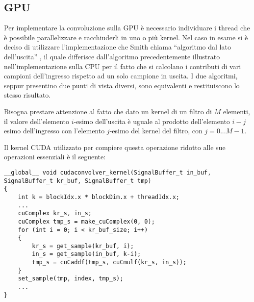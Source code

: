 \begin{comment}
In figura \ref{fig:pulse32conv} si può osservare il risultato della convoluzione di un impulso di 32 campioni con sé stesso ottenuto con l' algoritmo presentato.
\begin{figure}[h]
    \centering
    \subfloat[Impulso]{\texttt{[image: pulse32]}}
    \subfloat[Convoluzione]{\texttt{[image: pulse32conv]}}
    \caption{Convoluzione di un impulso rettangolare con sé stesso. In rosso è segnata la parte reale e in blu la parte immaginaria}
    \label{fig:pulse32conv}
\end{figure}
\end{comment}

\subsection{GPU}
Per implementare la convoluzione sulla GPU è necessario individuare i thread che è possibile parallelizzare e racchiuderli in uno o più kernel. Nel caso in esame si è deciso di utilizzare l'implementazione che Smith chiama ``algoritmo dal lato dell'uscita'' \cite[pp.~116-121]{dspguide}, il quale differisce dall'algoritmo precedentemente illustrato nell'implementazione sulla CPU per il fatto che si calcolano i contributi di vari campioni dell'ingresso rispetto ad un solo campione in uscita. I due algoritmi, seppur presentino due punti di vista diversi, sono equivalenti e restituiscono lo stesso risultato.

Bisogna prestare attenzione al fatto che dato un kernel di un filtro di $M$ elementi, il valore dell'elemento $i$-esimo dell'uscita è uguale al prodotto dell'elemento $i-j$ esimo dell'ingresso con l'elemento $j$-esimo del kernel del filtro, con $j = 0 ... M-1$.

Il kernel CUDA utilizzato per compiere questa operazione ridotto alle sue operazioni essenziali è il seguente:

\begin{lstlisting}
__global__ void cudaconvolver_kernel(SignalBuffer_t in_buf, SignalBuffer_t kr_buf, SignalBuffer_t tmp)
{
    int k = blockIdx.x * blockDim.x + threadIdx.x;
    ...
    cuComplex kr_s, in_s;
    cuComplex tmp_s = make_cuComplex(0, 0);
    for (int i = 0; i < kr_buf_size; i++)
    {
        kr_s = get_sample(kr_buf, i);
        in_s = get_sample(in_buf, k-i);
        tmp_s = cuCaddf(tmp_s, cuCmulf(kr_s, in_s));
    }
    set_sample(tmp, index, tmp_s);
    ...
}
\end{lstlisting}

